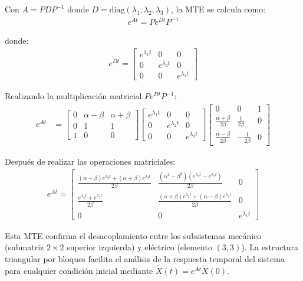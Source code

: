 \documentclass[
  11pt,
  letterpaper,
   addpoints,
   answers
  ]{exam}
\begin{document}
\begin{solution}
Con $A = PDP^{-1}$ donde $D = \text{diag}(\lambda_1, \lambda_2, \lambda_3)$, la MTE se calcula como:
\begin{align}
e^{At} = P e^{Dt} P^{-1}
\end{align}

donde:
\begin{align}
e^{Dt} = \begin{bmatrix}
e^{\lambda_1 t} & 0 & 0 \\
0 & e^{\lambda_2 t} & 0 \\
0 & 0 & e^{\lambda_3 t}
\end{bmatrix}
\end{align}

Realizando la multiplicación matricial $Pe^{Dt}P^{-1}$:
\begin{align}
e^{At} &= \begin{bmatrix}
0 & \alpha - \beta & \alpha + \beta \\
0 & 1 & 1 \\
1 & 0 & 0
\end{bmatrix} \begin{bmatrix}
e^{\lambda_1 t} & 0 & 0 \\
0 & e^{\lambda_2 t} & 0 \\
0 & 0 & e^{\lambda_3 t}
\end{bmatrix} \begin{bmatrix}
0 & 0 & 1 \\
\frac{\alpha + \beta}{2\beta} & \frac{1}{2\beta} & 0 \\
\frac{\alpha - \beta}{2\beta} & -\frac{1}{2\beta} & 0
\end{bmatrix}
\end{align}

Después de realizar las operaciones matriciales:
\begin{align}
\boxed{
e^{At} = \begin{bmatrix}
\frac{(\alpha-\beta)e^{\lambda_2 t} + (\alpha+\beta)e^{\lambda_3 t}}{2\beta} & \frac{(\alpha^2-\beta^2)(e^{\lambda_2 t} - e^{\lambda_3 t})}{2\beta} & 0 \\[6pt]
\frac{e^{\lambda_2 t} + e^{\lambda_3 t}}{2\beta} & \frac{(\alpha+\beta)e^{\lambda_2 t} + (\alpha-\beta)e^{\lambda_3 t}}{2\beta} & 0 \\[6pt]
0 & 0 & e^{\lambda_1 t}
\end{bmatrix}
}
\end{align}

Esta MTE confirma el desacoplamiento entre los subsistemas mecánico (submatriz $2 \times 2$ superior izquierda) y eléctrico (elemento $(3,3)$). La estructura triangular por bloques facilita el análisis de la respuesta temporal del sistema para cualquier condición inicial mediante $\tilde{X}(t) = e^{At}\tilde{X}(0)$.


\end{solution}
\end{document}
